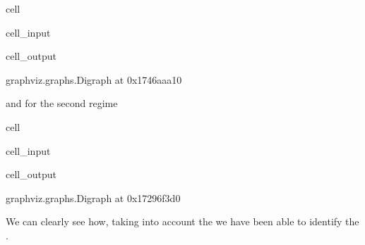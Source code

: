 \documentclass[letterpaper,10pt,english]{jupyterBook}
\begin{document}
\begin{sphinxuseclass}{cell}\begin{sphinxVerbatimInput}

\begin{sphinxuseclass}{cell_input}
\begin{sphinxVerbatim}[commandchars=\\\{\}]
  
\end{sphinxVerbatim}

\end{sphinxuseclass}\end{sphinxVerbatimInput}
\begin{sphinxVerbatimOutput}

\begin{sphinxuseclass}{cell_output}
\begin{sphinxVerbatim}[commandchars=\\\{\}]
\PYGZlt{}graphviz.graphs.Digraph at 0x1746aaa10\PYGZgt{}
\end{sphinxVerbatim}

\end{sphinxuseclass}\end{sphinxVerbatimOutput}

\end{sphinxuseclass}
\sphinxAtStartPar
and for the second regime

\begin{sphinxuseclass}{cell}\begin{sphinxVerbatimInput}

\begin{sphinxuseclass}{cell_input}
\begin{sphinxVerbatim}[commandchars=\\\{\}]
 
\end{sphinxVerbatim}

\end{sphinxuseclass}\end{sphinxVerbatimInput}
\begin{sphinxVerbatimOutput}

\begin{sphinxuseclass}{cell_output}
\begin{sphinxVerbatim}[commandchars=\\\{\}]
\PYGZlt{}graphviz.graphs.Digraph at 0x17296f3d0\PYGZgt{}
\end{sphinxVerbatim}

\end{sphinxuseclass}\end{sphinxVerbatimOutput}

\end{sphinxuseclass}
\sphinxAtStartPar
We can clearly see how, taking into account the  we have been able to identify the .
\end{document}
